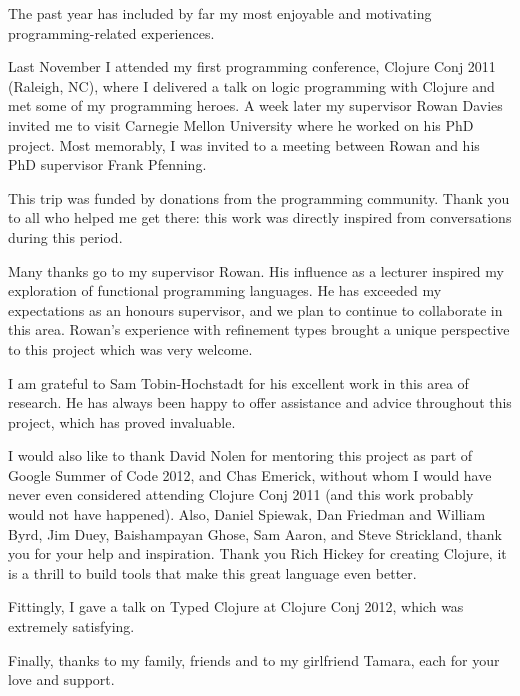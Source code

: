 \documentclass{cshonours}
\begin{document}
\begin{acknowledgements}

The past year has included by far my most enjoyable and motivating programming-related experiences.

Last November I attended my first programming conference, Clojure Conj 2011 (Raleigh, NC),
where I delivered a talk on logic programming with Clojure and met some of my programming heroes.
A week later my supervisor Rowan Davies invited me to visit Carnegie Mellon University
where he worked on his PhD project. Most memorably, I was invited to a meeting between
Rowan and his PhD supervisor Frank Pfenning.

This trip was funded by donations from the programming community. Thank you to all who helped me get there:
this work was directly inspired from conversations during this period.

Many thanks go to my supervisor Rowan. His influence as a lecturer inspired my exploration of
functional programming languages. He has exceeded my expectations as an honours supervisor,
and we plan to continue to collaborate in this area.
Rowan's experience with refinement types brought a unique perspective to this project
which was very welcome.

I am grateful to Sam Tobin-Hochstadt for his excellent work in this area of research.
He has always been happy to offer assistance and advice throughout this project, which has proved invaluable.

I would also like to thank David Nolen for mentoring this project as part of Google Summer of Code 2012,
and Chas Emerick, without whom I would have never even considered attending Clojure Conj 2011
(and this work probably would not have happened).
Also, Daniel Spiewak, Dan Friedman and William Byrd, Jim Duey, Baishampayan Ghose, Sam Aaron, and
Steve Strickland, thank you for your help and inspiration.
Thank you Rich Hickey for creating Clojure, it is a thrill to build tools that make
this great language even better.

Fittingly, I gave a talk on Typed Clojure at Clojure Conj 2012, which was extremely satisfying.

Finally, thanks to my family, friends and to my girlfriend Tamara, each for your love and support.

\end{acknowledgements}

\tableofcontents




\end{document}
